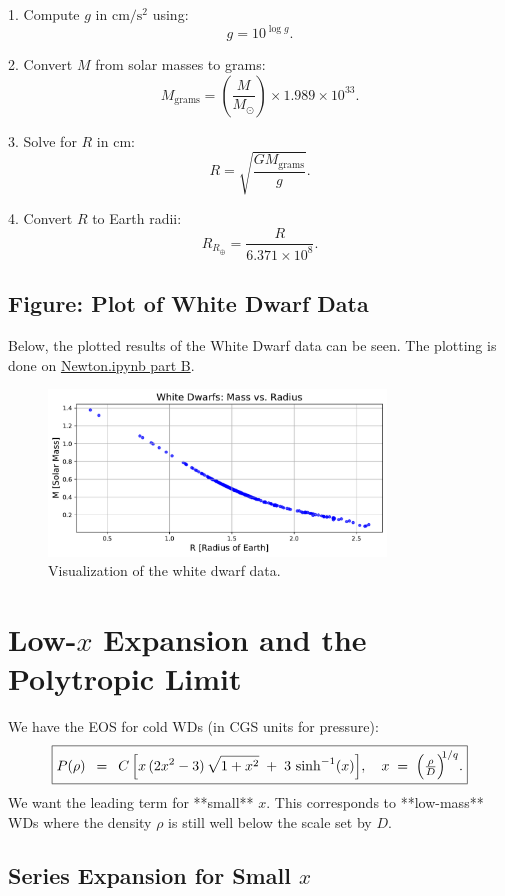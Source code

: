 \documentclass[12pt]{article}
\begin{document}
1. Compute \(g\) in \(\mathrm{cm/s^2}\) using:
   \[
   g = 10^{\log g}.
   \]

2. Convert \(M\) from solar masses to grams:
   \[
   M_{\mathrm{grams}} = \left(\frac{M}{M_\odot}\right) \times 1.989 \times 10^{33}.
   \]

3. Solve for \(R\) in \(\mathrm{cm}\):
   \[
   R = \sqrt{\frac{G M_{\mathrm{grams}}}{g}}.
   \]

4. Convert \(R\) to Earth radii:
   \[
   R_{R_\oplus} = \frac{R}{6.371 \times 10^8}.
   \]

\subsection{Figure: Plot of White Dwarf Data}

Below, the plotted results of the White Dwarf data can be seen. The plotting is done on \href{Newton.ipynb}{Newton.ipynb part B}.

\begin{figure}[h!]
    \centering
    \includegraphics[width=0.8\textwidth]{Newton_PartB_WhiteDwarfDataFitting.pdf}
    \caption{Visualization of the white dwarf data.}
    \label{fig:newtonian-visualization}
\end{figure}

\section{Low-\(x\) Expansion and the Polytropic Limit}

We have the EOS for cold WDs (in CGS units for pressure):
\[
\boxed{
P(\rho)
~\,=\,~
C\,\Bigl[x\,(2x^{2}-3)\,\sqrt{1 + x^{2}} \;+\; 3\,\sinh^{-1}(x)\Bigr],
\quad
x \;=\;\Bigl(\tfrac{\rho}{D}\Bigr)^{\!\!1/q}.
}
\]
We want the leading term for **small** \(x\). This corresponds to **low-mass** WDs where the density \(\rho\) is still well below the scale set by \(D\).

\subsection{Series Expansion for Small \(x\)}
\end{document}
